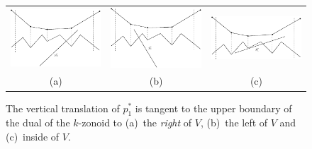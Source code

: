 \documentclass[charterfonts,lotsofwhite]{patmorin}
\begin{document}
\begin{figure}[h!]
 \begin{center}
   \begin{center}\begin{tabular}{ccc} 
   \includegraphics[width=1.8in]{figs/fig5a} &
   \includegraphics[width=1.8in]{figs/fig5b} &
   \includegraphics[width=1.8in]{figs/fig5c} \\
   (a) & (b) & (c)
   \end{tabular}\end{center}
   \caption{\label{fig_vertical_strip_abc} The vertical translation of $p_1^*$ is tangent to the
upper boundary of the dual of the $k$-zonoid to (a)~the \emph{right}
of $V$, (b)~the left of $V$ and (c)~inside of $V$.}
 \end{center}
\end{figure}
\end{document}

